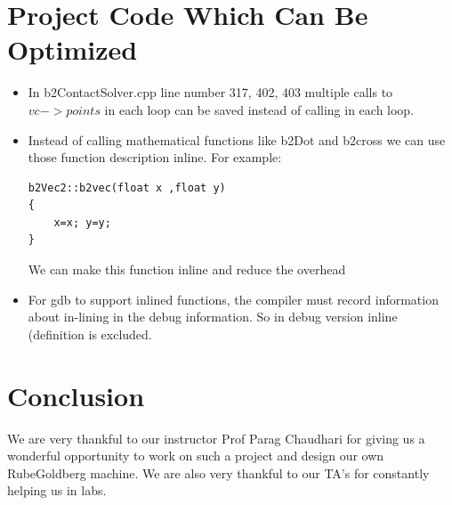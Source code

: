 \documentclass[a4paper,11pt]{article}
\begin{document}
\section{Project Code Which Can Be Optimized}
\begin{itemize}
\item In b2ContactSolver.cpp line number 317, 402, 403 multiple calls to $vc->points$ in each loop can be saved instead of calling in each loop.

\item Instead of calling mathematical functions like b2Dot and b2cross we can use those function description inline.
For example: 
\begin{verbatim}
b2Vec2::b2vec(float x ,float y)
{
	x=x; y=y;
}
\end{verbatim}
We can make  this function inline and reduce the overhead
	
	\item For gdb to support inlined functions, the compiler must record information about in-lining in the debug information. So in debug version inline (definition is excluded.

	\end{itemize}

\section{Conclusion}
	We are very thankful to our instructor Prof Parag Chaudhari for giving us a wonderful opportunity to work on such a project and design our own RubeGoldberg machine.
	We are also very thankful to our TA's for constantly helping us in labs.
\end{document}
